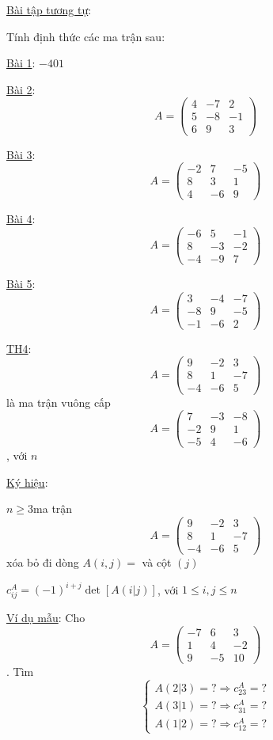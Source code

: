 \documentclass[
]{article}
\let\ul\uline
\begin{document}
\ul{Bài tập tương tự}:

Tính định thức các ma trận sau:

\ul{Bài 1}: $-401$

\ul{Bài 2}: $$A = \begin{pmatrix} 4 & -7 & 2 \\ 5 & -8 & -1 \\ 6 & 9 & 3 \end{pmatrix}$$

\ul{Bài 3}: $$A = \begin{pmatrix} -2 & 7 & -5 \\ 8 & 3 & 1 \\ 4 & -6 & 9 \end{pmatrix}$$

\ul{Bài 4}: $$A = \begin{pmatrix} -6 & 5 & -1 \\ 8 & -3 & -2 \\ -4 & -9 & 7 \end{pmatrix}$$

\ul{Bài 5}: $$A = \begin{pmatrix} 3 & -4 & -7 \\ -8 & 9 & -5 \\ -1 & -6 & 2 \end{pmatrix}$$

\ul{TH4}: $$A = \begin{pmatrix} 9 & -2 & 3 \\ 8 & 1 & -7 \\ -4 & -6 & 5 \end{pmatrix}$$ là
ma trận vuông cấp
$$A = \begin{pmatrix} 7 & -3 & -8 \\ -2 & 9 & 1 \\ -5 & 4 & -6 \end{pmatrix}$$, với
$n$

\ul{Ký hiệu}:

$n \ge 3$ma trận
$$A = \begin{pmatrix} 9 & -2 & 3 \\ 8 & 1 & -7 \\ -4 & -6 & 5 \end{pmatrix}$$ xóa bỏ đi dòng
$A(i,j) =$ và cột
$(j)$

$c_{ij}^A = (-1)^{i+j} \det[A(i|j)]$, với
$1 \le i, j \le n$

\ul{Ví dụ mẫu}: Cho
$$A = \begin{pmatrix} -7 & 6 & 3 \\ 1 & 4 & -2 \\ 9 & -5 & 10 \end{pmatrix}$$. Tìm
$$\begin{cases} A(2|3) = ? \Rightarrow c_{23}^A = ? \\ A(3|1) = ? \Rightarrow c_{31}^A = ? \\ A(1|2) = ? \Rightarrow c_{12}^A = ? \end{cases}$$
\end{document}
